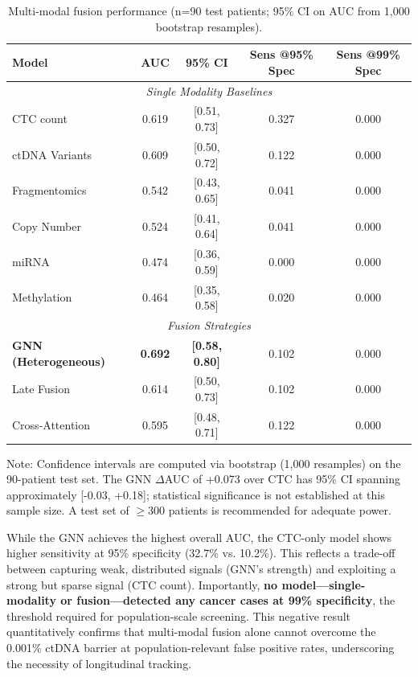 \documentclass[10pt,a4paper]{article}
\begin{document}
\begin{table}[H]
\centering
\caption{Multi-modal fusion performance (n=90 test patients; 95\% CI on AUC from 1,000 bootstrap resamples).}
\label{tab:fusion_performance}
\begin{tabular}{l c c c c}
\toprule
\textbf{Model} & \textbf{AUC} & \textbf{95\% CI} & \textbf{Sens @95\% Spec} & \textbf{Sens @99\% Spec} \\
\midrule
\multicolumn{5}{c}{\textit{Single Modality Baselines}} \\
\midrule
CTC count & 0.619 & [0.51, 0.73] & 0.327 & 0.000 \\
ctDNA Variants & 0.609 & [0.50, 0.72] & 0.122 & 0.000 \\
Fragmentomics & 0.542 & [0.43, 0.65] & 0.041 & 0.000 \\
Copy Number & 0.524 & [0.41, 0.64] & 0.041 & 0.000 \\
miRNA & 0.474 & [0.36, 0.59] & 0.000 & 0.000 \\
Methylation & 0.464 & [0.35, 0.58] & 0.020 & 0.000 \\
\midrule
\multicolumn{5}{c}{\textit{Fusion Strategies}} \\
\midrule
\textbf{GNN (Heterogeneous)} & \textbf{0.692} & \textbf{[0.58, 0.80]} & 0.102 & 0.000 \\
Late Fusion & 0.614 & [0.50, 0.73] & 0.102 & 0.000 \\
Cross-Attention & 0.595 & [0.48, 0.71] & 0.122 & 0.000 \\
\bottomrule
\end{tabular}
\vspace{0.3cm}
\footnotesize{Note: Confidence intervals are computed via bootstrap (1,000 resamples) on the 90-patient test set. The GNN $\Delta$AUC of +0.073 over CTC has 95\% CI spanning approximately [-0.03, +0.18]; statistical significance is not established at this sample size. A test set of $\geq$300 patients is recommended for adequate power.}
\end{table}

While the GNN achieves the highest overall AUC, the CTC-only model shows higher sensitivity at 95\% specificity (32.7\% vs. 10.2\%). This reflects a trade-off between capturing weak, distributed signals (GNN's strength) and exploiting a strong but sparse signal (CTC count). Importantly, \textbf{no model—single-modality or fusion—detected any cancer cases at 99\% specificity}, the threshold required for population-scale screening. This negative result quantitatively confirms that multi-modal fusion alone cannot overcome the 0.001\% ctDNA barrier at population-relevant false positive rates, underscoring the necessity of longitudinal tracking.
\end{document}
